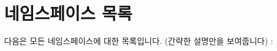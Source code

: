 \section{네임스페이스 목록}
다음은 모든 네임스페이스에 대한 목록입니다. (간략한 설명만을 보여줍니다) \+:\begin{DoxyCompactList}
\item{}
\end{DoxyCompactList}
